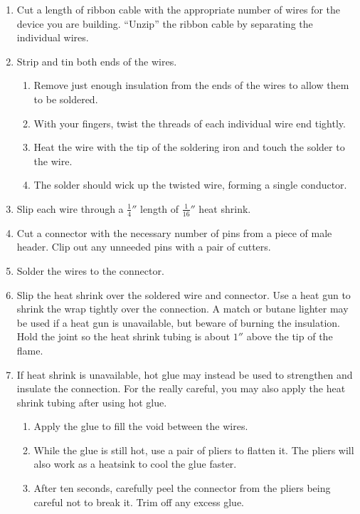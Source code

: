 \begin{enumerate}

 \item Cut a length of ribbon cable with the appropriate number of
 wires for the device you are building.  ``Unzip'' the ribbon cable by
 separating the individual wires.

 \item Strip and tin both ends of the wires. 

\begin{enumerate}
\item Remove just enough insulation from the ends of the wires to allow
  them to be soldered. 

\item  With your fingers, twist the threads of each
  individual wire end tightly.  

\item Heat the wire with the tip of the soldering iron and touch the
  solder to the wire.  

\item The solder should wick up the twisted wire, forming a single
  conductor. 

\end{enumerate}

 \item Slip each wire through a $\frac{1}{4}''$ length of
 $\frac{1}{16}''$ heat shrink.

 \item Cut a connector with the necessary number of pins from a piece
 of male header. Clip out any unneeded pins with a pair of cutters.

 \item Solder the wires to the connector.

 \item Slip the heat shrink over the soldered wire and connector. Use
 a heat gun to shrink the wrap tightly over the connection. A match or
 butane lighter may be used if a heat gun is unavailable, but beware
 of burning the insulation.  Hold the joint so the heat shrink tubing
 is about $1''$ above the tip of the flame.

 \item If heat shrink is unavailable, hot glue may instead be used to
 strengthen and insulate the connection.  For the really careful, you
 may also apply the heat shrink tubing after using hot glue.

 \begin{enumerate}

  \item Apply the glue to fill the void between the wires.

  \item While the glue is still hot, use a pair of pliers to flatten
  it. The pliers will also work as a heatsink to cool the glue faster.

  \item After ten seconds, carefully peel the connector from the
  pliers being careful not to break it. Trim off any excess glue.

 \end{enumerate}

\end{enumerate}

